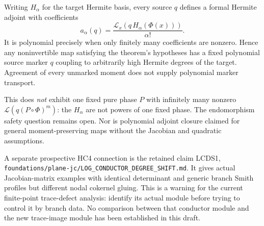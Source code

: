 \documentclass[11pt]{article}
\begin{document}
Writing $H_\alpha$ for the target Hermite basis, every source $q$ defines
a formal Hermite adjoint with coefficients
\[
 a_\alpha(q)=\frac{\mathcal L_x(q\,H_\alpha(\Phi(x)))}{\alpha!}.
\]
It is polynomial precisely when only finitely many coefficients are
nonzero. Hence any noninvertible map satisfying the theorem's hypotheses
has a fixed polynomial source marker $q$ coupling to arbitrarily high
Hermite degrees of the target. Agreement of every unmarked moment does
not supply polynomial marker transport.

This does \emph{not} exhibit one fixed pure phase $P$ with infinitely many
nonzero $\mathcal L(q(P\circ\Phi)^m)$: the $H_\alpha$ are not powers of
one fixed phase. The endomorphism safety question remains open.
Nor is polynomial adjoint closure claimed for general moment-preserving
maps without the Jacobian and quadratic assumptions.

A separate prospective HC4 connection is the retained claim LCDS1,
\texttt{foundations/plane-jc/LOG\_CONDUCTOR\_DEGREE\_SHIFT.md}.
It gives actual Jacobian-matrix examples with identical determinant and
generic branch Smith profiles but different nodal cokernel gluing.
This is a warning for the current finite-point trace-defect analysis:
identify its actual module before trying to control it by branch data.
No comparison between that conductor module and the new trace-image
module has been established in this draft.
\end{document}
